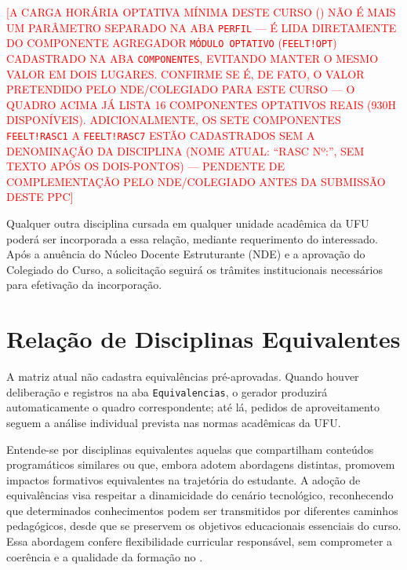 

\textcolor{red}{[A CARGA HORÁRIA OPTATIVA MÍNIMA DESTE CURSO (\textbf{}) NÃO É MAIS UM PARÂMETRO SEPARADO NA ABA \texttt{PERFIL} — É LIDA DIRETAMENTE DO COMPONENTE AGREGADOR \texttt{MÓDULO OPTATIVO} (\texttt{FEELT!OPT}) CADASTRADO NA ABA \texttt{COMPONENTES}, EVITANDO MANTER O MESMO VALOR EM DOIS LUGARES. CONFIRME SE \textbf{} É, DE FATO, O VALOR PRETENDIDO PELO NDE/COLEGIADO PARA ESTE CURSO — O QUADRO ACIMA JÁ LISTA 16 COMPONENTES OPTATIVOS REAIS (930H DISPONÍVEIS). ADICIONALMENTE, OS SETE COMPONENTES \texttt{FEELT!RASC1} A \texttt{FEELT!RASC7} ESTÃO CADASTRADOS SEM A DENOMINAÇÃO DA DISCIPLINA (NOME ATUAL: ``RASC Nº:'', SEM TEXTO APÓS OS DOIS-PONTOS) — PENDENTE DE COMPLEMENTAÇÃO PELO NDE/COLEGIADO ANTES DA SUBMISSÃO DESTE PPC]}

Qualquer outra disciplina cursada em qualquer unidade acadêmica da UFU poderá ser incorporada a essa relação, mediante requerimento do interessado. Após a anuência do Núcleo Docente Estruturante (NDE) e a aprovação do Colegiado do Curso, a solicitação seguirá os trâmites institucionais necessários para efetivação da incorporação.

\section{Relação de Disciplinas Equivalentes}
\label{sec:equivalentes}

A matriz atual não cadastra equivalências pré-aprovadas. Quando houver deliberação e registros na aba \texttt{Equivalencias}, o gerador produzirá automaticamente o quadro correspondente; até lá, pedidos de aproveitamento seguem a análise individual prevista nas normas acadêmicas da UFU.

Entende-se por disciplinas equivalentes aquelas que compartilham conteúdos programáticos similares ou que, embora adotem abordagens distintas, promovem impactos formativos equivalentes na trajetória do estudante. A adoção de equivalências visa respeitar a dinamicidade do cenário tecnológico, reconhecendo que determinados conhecimentos podem ser transmitidos por diferentes caminhos pedagógicos, desde que se preservem os objetivos educacionais essenciais do curso. Essa abordagem confere flexibilidade curricular responsável, sem comprometer a coerência e a qualidade da formação no \ppccurso.


